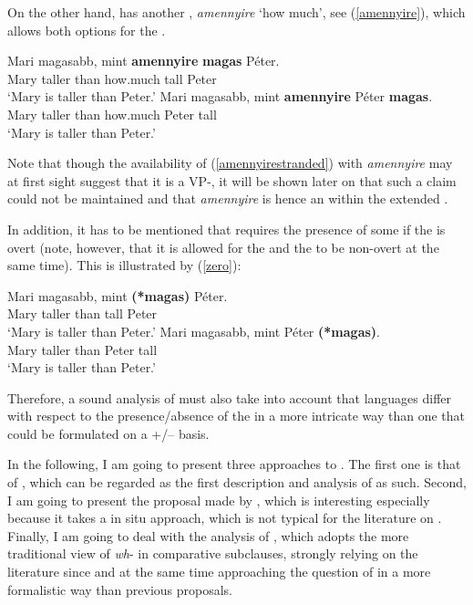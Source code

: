 \z 

On the other hand,  has another , \textit{amennyire} `how much', see (\ref{amennyire}), which allows both options for the .

\ea \label{amennyire}
\ea \gll 	Mari magasabb, mint \textbf{amennyire} \textbf{magas} P\'eter.\\
Mary taller than how.much tall Peter\\
\glt `Mary is taller than Peter.'
\ex \gll Mari magasabb, mint \textbf{amennyire} P\'eter \textbf{magas}.\label{amennyirestranded}\\
Mary taller than how.much Peter tall\\
\glt `Mary is taller than Peter.'
\z
\z

Note that though the availability of (\ref{amennyirestranded}) with \textit{amennyire} may at first sight suggest that it is a VP-, it will be shown later on that such a claim could not be maintained and that \textit{amennyire} is hence an  within the extended .

In addition, it has to be mentioned that  requires the presence of some  if the  is overt (note, however, that it is allowed for the  and the  to be non-overt at the same time). This is illustrated by (\ref{zero}):

\ea \label{zero}
\ea \gll Mari magasabb, mint \textbf{(*magas)} P\'eter.\\
Mary taller than \phantom{\textbf{(*}}tall Peter\\
\glt `Mary is taller than Peter.'
\ex \gll Mari magasabb, mint P\'eter \textbf{(*magas)}.\\
Mary taller than Peter \phantom{\textbf{(*}}tall\\
\glt `Mary is taller than Peter.'
\z
\z

Therefore, a sound analysis of  must also take into account that languages differ with respect to the presence/absence of the  in a more intricate way than one that could be formulated on a +/-- basis.

In the following, I am going to present three approaches to . The first one is that of \citet{bresnan1973}, which can be regarded as the first description and analysis of  as such. Second, I am going to present the proposal made by \citet{lechner1999diss, lechner2004}, which is interesting especially because it takes a  in situ approach, which is not typical for the literature on . Finally, I am going to deal with the analysis of \citet{kennedy2002}, which adopts the more traditional view of \textit{wh}- in comparative subclauses, strongly relying on the literature since \citet{bresnan1973} and at the same time approaching the question of  in a more formalistic way than previous proposals.

